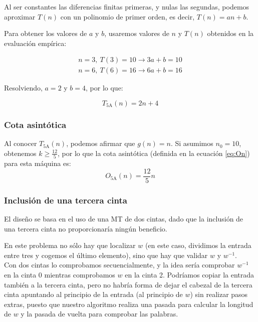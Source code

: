 Al ser constantes las diferencias finitas primeras, y nulas las segundas, podemos aproximar $T(n)$ con un polinomio de primer orden, es decir, $T(n) = an + b$.\medskip

Para obtener los valores de $a$ y $b$, usaremos valores de $n$ y $T(n)$ obtenidos en la evaluación empírica:

\begin{subequations}
    \begin{gather*}
        n = 3,\ T(3) = 10 \rightarrow 3a + b = 10 \\
        n = 6,\ T(6) = 16 \rightarrow 6a + b = 16
    \end{gather*}
\end{subequations}

Resolviendo, $a=2$ y $b=4$, por lo que:

\begin{equation}
    T_{\mathrm{5A}}(n) = 2n + 4
\end{equation}


\subsubsection*{Cota asintótica}
Al conocer $T_{\mathrm{5A}}(n)$, podemos afirmar que $g(n) = n$. Si asumimos $n_0 = 10$, obtenemos $k \geq \frac{12}{5}$, por lo que la cota asintótica (definida en la ecuación \ref{eq:On}) para esta máquina es:
\begin{equation}
    O_{\mathrm{5A}}(n) = \frac{12}{5} n
\end{equation}



\subsubsection*{Inclusión de una tercera cinta}
El diseño se basa en el uso de una MT de dos cintas, dado que la inclusión de una tercera cinta no proporcionaría ningún beneficio.

En este problema no sólo hay que localizar $w$ (en este caso, dividimos la entrada entre tres y cogemos el último elemento), sino que hay que validar $w$ y $w^{-1}$.\\
Con dos cintas lo comprobamos secuencialmente, y la idea sería comprobar $w^{-1}$ en la cinta 0 mientras comprobamos $w$ en la cinta 2.
Podríamos copiar la entrada también a la tercera cinta, pero no habría forma de dejar el cabezal de la tercera cinta apuntando al principio de la entrada (al principio de $w$) sin realizar pasos extras, puesto que nuestro algoritmo realiza una pasada para calcular la longitud de $w$ y la pasada de vuelta para comprobar las palabras.



